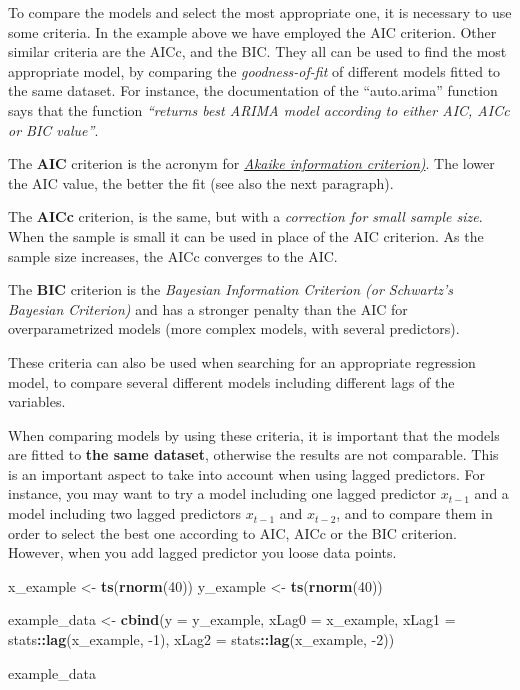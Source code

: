 \documentclass[
]{article}
\newenvironment{Shaded}{\begin{snugshade}}{\end{snugshade}}
\newcommand{\DataTypeTok}[1]{\textcolor[rgb]{0.13,0.29,0.53}{#1}}
\newcommand{\DecValTok}[1]{\textcolor[rgb]{0.00,0.00,0.81}{#1}}
\newcommand{\KeywordTok}[1]{\textcolor[rgb]{0.13,0.29,0.53}{\textbf{#1}}}
\newcommand{\NormalTok}[1]{#1}
\newcommand{\OperatorTok}[1]{\textcolor[rgb]{0.81,0.36,0.00}{\textbf{#1}}}
\newcommand{\StringTok}[1]{\textcolor[rgb]{0.31,0.60,0.02}{#1}}
\begin{document}
To compare the models and select the most appropriate one, it is necessary to use some criteria. In the example above we have employed the AIC criterion. Other similar criteria are the AICc, and the BIC. They all can be used to find the most appropriate model, by comparing the \emph{goodness-of-fit} of different models fitted to the same dataset. For instance, the documentation of the ``auto.arima'' function says that the function \emph{``returns best ARIMA model according to either AIC, AICc or BIC value''}.

The \textbf{AIC} criterion is the acronym for \href{https://en.wikipedia.org/wiki/Akaike_information_criterion}{\emph{Akaike information criterion)}}. The lower the AIC value, the better the fit (see also the next paragraph).

The \textbf{AICc} criterion, is the same, but with a \emph{correction for small sample size}. When the sample is small it can be used in place of the AIC criterion. As the sample size increases, the AICc converges to the AIC.

The \textbf{BIC} criterion is the \emph{Bayesian Information Criterion (or Schwartz's Bayesian Criterion)} and has a stronger penalty than the AIC for overparametrized models (more complex models, with several predictors).

These criteria can also be used when searching for an appropriate regression model, to compare several different models including different lags of the variables.

When comparing models by using these criteria, it is important that the models are fitted to \textbf{the same dataset}, otherwise the results are not comparable. This is an important aspect to take into account when using lagged predictors. For instance, you may want to try a model including one lagged predictor \(x_{t-1}\) and a model including two lagged predictors \(x_{t-1}\) and \(x_{t-2}\), and to compare them in order to select the best one according to AIC, AICc or the BIC criterion. However, when you add lagged predictor you loose data points.

\begin{Shaded}
\begin{Highlighting}[]
\NormalTok{x_example <-}\StringTok{ }\KeywordTok{ts}\NormalTok{(}\KeywordTok{rnorm}\NormalTok{(}\DecValTok{40}\NormalTok{))}
\NormalTok{y_example <-}\StringTok{ }\KeywordTok{ts}\NormalTok{(}\KeywordTok{rnorm}\NormalTok{(}\DecValTok{40}\NormalTok{))}

\NormalTok{example_data <-}\StringTok{ }\KeywordTok{cbind}\NormalTok{(}\DataTypeTok{y =}\NormalTok{ y_example,}
                      \DataTypeTok{xLag0 =}\NormalTok{ x_example,}
                      \DataTypeTok{xLag1 =}\NormalTok{ stats}\OperatorTok{::}\KeywordTok{lag}\NormalTok{(x_example, }\DecValTok{-1}\NormalTok{),}
                      \DataTypeTok{xLag2 =}\NormalTok{ stats}\OperatorTok{::}\KeywordTok{lag}\NormalTok{(x_example, }\DecValTok{-2}\NormalTok{))}

\NormalTok{example_data}
\end{Highlighting}
\end{Shaded}
\end{document}
